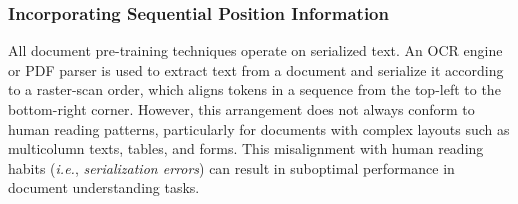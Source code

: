 




\subsubsection{Incorporating Sequential Position Information}

All document pre-training techniques operate on serialized text. An \ac{OCR} engine or PDF parser is used to extract text from a document and serialize it according to a raster-scan order, which aligns tokens in a sequence from the top-left to the bottom-right corner. However, this arrangement does not always conform to human reading patterns, particularly for documents with complex layouts such as multicolumn texts, tables, and forms. This misalignment with human reading habits (\textit{i.e.}, \textit{serialization errors}) can result in suboptimal performance in document understanding tasks. 

